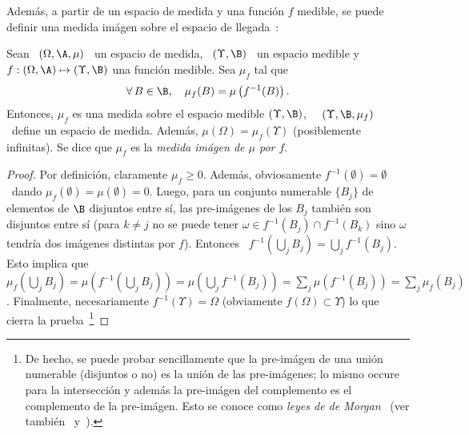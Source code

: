 Adem\'as, a partir de un espacio de medida y una funci\'on $f$ medible, se puede
definir  una  medida  im\'agen   sobre  el  espacio  de  llegada~\cite{AshDol99,
  AthLah06, Bog07:v1, Coh13}:
%
\begin{teorema}
\label{Teo:MP:MedidaImagen}
%
  Sean  \ $(\Omega,\A,\mu)$  \  un espacio  de  medida, \  $(\Upsilon,\B)$ \  un
  espacio  medible  y  $f:  (\Omega,\A)  \mapsto  (\Upsilon,\B)$  una  funci\'on
  medible. Sea $\mu_f$ tal que
  \[
  \forall \,  B \in  \B, \quad  \mu_f(B) = \mu\left( f^{-1}(B) \right).
  \]
  Entonces, $\mu_f$  es una medida  sobre el espacio medible  $(\Upsilon,\B)$, \
  \ie  \  $(\Upsilon,\B,\mu_f)$  \  define  un  espacio  de  medida.   Adem\'as,
  $\mu(\Omega) = \mu_f(\Upsilon)$ (posiblemente  infinitas). Se dice que $\mu_f$
  es la {\it medida im\'agen de $\mu$ por $f$}.
\end{teorema}
%
\begin{proof}
  Por   definici\'on,  claramente   $\mu_f  \ge   0$.    Adem\'as,  obviosamente
  $f^{-1}(\emptyset) =  \emptyset$ \ dando $\mu_f(\emptyset)  = \mu(\emptyset) =
  0$.   Luego, para  un conjunto  numerable  $\{ B_j  \}$ de  elementos de  $\B$
  disjuntos entre s\'i, las pre-im\'agenes  de los $B_j$ tambi\'en son disjuntos
  entre s\'i  (para $k  \ne j$ no  se puede  tener $\omega \in  f^{-1}(B_j) \cap
  f^{-1}(B_k)$  sino  $\omega$  tendr\'ia  dos im\'agenes  distintas  por  $f$).
  Entonces \ $f^{-1}\left( \bigcup_j B_j \right) = \bigcup_j f^{-1}(B_j)$.  Esto
  implica  que \  $\mu_f\left( \bigcup_j  B_j \right)  =  \mu\left( f^{-1}\left(
      \bigcup_j B_j \right) \right)  = \mu\left( \bigcup_j f^{-1}(B_j) \right) =
  \sum_j  \mu\left(  f^{-1}(B_j)  \right)  =  \sum_j  \mu_f(B_j)$.   Finalmente,
  necesariamente  $f^{-1}(\Upsilon) =  \Omega$ (obviamente  $f(\Omega) \subset
  \Upsilon$)  lo  que  cierra  la  prueba~\footnote{De hecho,  se  puede  probar
    sencillamente que la pre-im\'agen de  una uni\'on numerable (disjuntos o no)
    es la uni\'on de las  pre-im\'agenes; lo mismo occure para la intersecci\'on
    y  adem\'as  la  pre-im\'agen  del  complemento  es  el  complemento  de  la
    pre-im\'agen.  Esto se conoce  como {\it leyes de de Morgan}~\cite{AshDol99,
      AthLah06,   Coh13,    HogMck13}   (ver   tambi\'en~\cite[Cap.~1]{KolFom57}
    y~\cite[Caps.~5~\&~6]{KolFom61}).\label{Foot:MP:Jacobiana}}
\end{proof}

